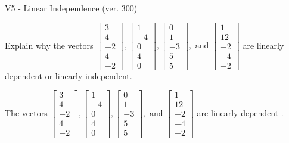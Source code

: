 \begin{exercise}
  \begin{exerciseTitle}V5 - Linear Independence (ver. 300)\end{exerciseTitle}
  \begin{exerciseStatement}
    Explain why the vectors \(\left[\begin{array}{r}
3 \\
4 \\
-2 \\
4 \\
-2
\end{array}\right] , \left[\begin{array}{r}
1 \\
-4 \\
0 \\
4 \\
0
\end{array}\right] , \left[\begin{array}{r}
0 \\
1 \\
-3 \\
5 \\
5
\end{array}\right] , \text{ and } \left[\begin{array}{r}
1 \\
12 \\
-2 \\
-4 \\
-2
\end{array}\right]\) are linearly dependent or linearly independent.	


  \end{exerciseStatement}
  \begin{exerciseAnswer}
   The vectors \(\left[\begin{array}{r}
3 \\
4 \\
-2 \\
4 \\
-2
\end{array}\right] , \left[\begin{array}{r}
1 \\
-4 \\
0 \\
4 \\
0
\end{array}\right] , \left[\begin{array}{r}
0 \\
1 \\
-3 \\
5 \\
5
\end{array}\right] , \text{ and } \left[\begin{array}{r}
1 \\
12 \\
-2 \\
-4 \\
-2
\end{array}\right]\) are 
  	 linearly dependent  .
  


  \end{exerciseAnswer}
\end{exercise}